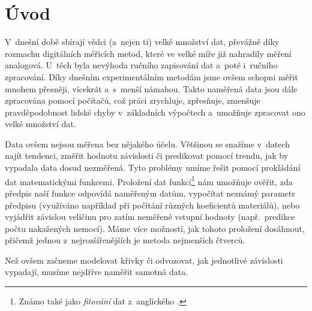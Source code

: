 \section{Úvod}
V~dnešní době sbírají vědci (a~nejen ti) velké množství dat, převážně díky
rozmachu digitálních měřicích metod, které ve velké míře již nahradily měření
analogová. U~těch byla nevýhoda ručního zapisování dat a~poté i~ručního
zpracování. Díky dnešním experimentálním metodám jsme ovšem schopni měřit
mnohem přesněji, vícekrát a~s~menší námahou. Takto naměřená data jsou dále
zpracována pomocí počítačů, což práci zrychluje, zpřesňuje, zmenšuje
pravděpodobnost lidské chyby v~základních výpočtech a~umožňuje zpracovat ono
velké množství dat.

Data ovšem nejsou měřena bez nějakého účelu. Většinou se snažíme v~datech najít
tendenci, změřit hodnotu závislosti či predikovat pomocí trendu, jak by
vypadala data dosud nezměřená. Tyto problémy umíme řešit pomocí prokládání dat
matematickými funkcemi. Proložení dat funkcí\footnote{Známo také jako
\emph{fitování} dat z~anglického .} nám umožňuje ověřit, zda předpis
naší funkce odpovídá naměřeným datům, vypočítat neznámý parametr předpisu
(využíváno například při počítání různých koeficientů materiálů), nebo
vyjádřit závislou veličinu pro zatím neměřené vstupní hodnoty (např.~predikce
počtu nakažených nemocí). Máme více možností, jak tohoto proložení dosáhnout,
přičemž jednou z~nejrozšířenějších je metoda nejmenších čtverců.


Než ovšem začneme modelovat křivky či odvozovat, jak jednotlivé
závislosti vypadají, musíme nejdříve naměřit samotná data. 

